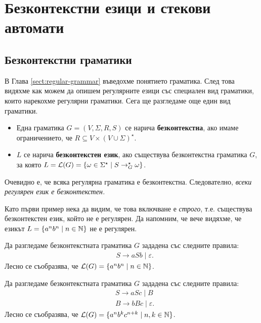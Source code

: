 \chapter{Безконтекстни езици и стекови автомати}

\section{Безконтекстни граматики}
В Глава \ref{sect:regular-grammar} въведохме понятието граматика. След това видяхме как можем да опишем регулярните езици
със специален вид граматики, които нарекохме регулярни граматики.
Сега ще разгледаме още един вид граматики.
\begin{itemize}
\item 
  Една граматика $G = (V, \Sigma, R, S)$ се нарича {\bf безконтекстна}, ако 
  имаме ограничението, че $R \subseteq V\times (V\cup\Sigma)^\star$.
\item
  $L$ се нарича {\bf безконтекстен език}, ако съществува безконтекстна граматика $G$, за която 
  $L = \mathcal{L}(G) = \{\omega \in \Sigma^\star \mid S \to^\star_G \omega\}$.
\end{itemize}

\begin{remark}
  Очевидно е, че всяка регулярна граматика е безконтекстна. Следователно, 
  {\em всеки регулярен език е безконтекстен.}
\end{remark}

Като първи пример нека да видим, че това включване е {\em строго}, т.е. съществува безконтекстен език, който не е регулярен.
Да напомним, че вече видяхме, че езикът $L = \{a^nb^n \mid n\in\mathbb{N}\}$ не е регулярен.

\begin{example}
  Да разгледаме безконтекстната граматика $G$ зададена със следните правила:
  \begin{align*}
    & S \to aSb \mid \varepsilon.
  \end{align*}
  Лесно се съобразява, че $\mathcal{L}(G) = \{a^nb^n \mid n\in\mathbb{N}\}$.
\end{example}

\begin{example}
  Да разгледаме безконтекстната граматика $G$ зададена със следните правила:
  \begin{align*}
    & S \to aSc \mid B\\
    & B \to bBc \mid \varepsilon.
  \end{align*}
  Лесно се съобразява, че $\mathcal{L}(G) = \{a^nb^kc^{n+k} \mid n,k\in\mathbb{N}\}$.
\end{example}

